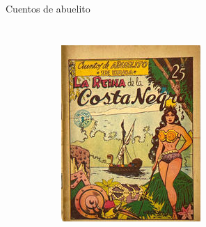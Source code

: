 \begin{frame}{Cuentos de abuelito}
\begin{columns}
\begin{figure}[htb]
\begin{subfigure}[b]{0.35\textwidth}
				\includegraphics[width=\textwidth]{img/abuelito01}
			\end{subfigure}
			\\
			\begin{subfigure}[b]{0.35\textwidth}

\end{subfigure}
\end{figure}
\end{columns}
\end{frame}
